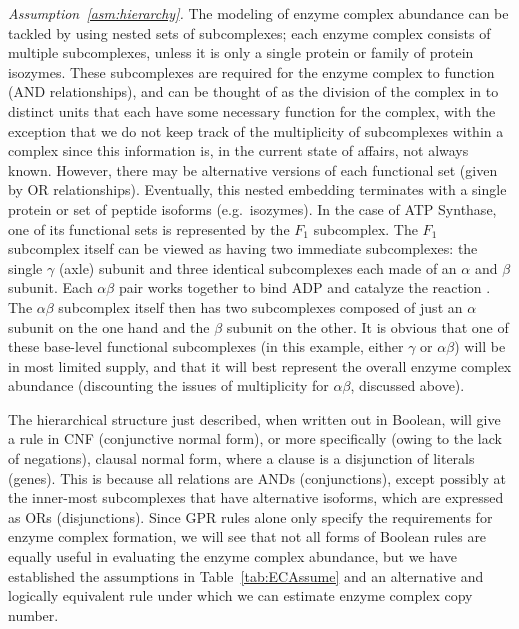 \emph{Assumption~\ref{asm:hierarchy}.}
The modeling of enzyme complex abundance can be tackled by using
nested sets of subcomplexes; each enzyme complex consists of multiple
subcomplexes, unless it is only a single protein or family of protein
isozymes.  These subcomplexes are required for the enzyme complex to
function (AND relationships), and can be thought of as the division of
the complex in to distinct units that each have some necessary
function for the complex, with the exception that we do not keep track
of the multiplicity of subcomplexes within a complex since this
information is, in the current state of affairs, not always known.
However, there may be alternative versions of each functional set
(given by OR relationships). Eventually, this nested embedding
terminates with a single protein or set of peptide isoforms
(e.g.\ isozymes).  In the case of ATP Synthase, one of its functional
sets is represented by the $F_1$ subcomplex. The $F_1$ subcomplex
itself can be viewed as having two immediate subcomplexes: the single
$\gamma$ (axle) subunit and three identical subcomplexes each made of
an $\alpha$ and $\beta$ subunit. Each $\alpha\beta$ pair works
together to bind ADP and catalyze the reaction \citep{Oster2003}. The
$\alpha\beta$ subcomplex itself then has two subcomplexes composed of
just an $\alpha$ subunit on the one hand and the $\beta$ subunit on
the other.  It is obvious that one of these base-level functional
subcomplexes (in this example, either $\gamma$ or $\alpha\beta$) will
be in most limited supply, and that it will best represent the overall
enzyme complex abundance (discounting the issues of multiplicity for
$\alpha\beta$, discussed above).

%
%

The hierarchical structure just described, when written out in
Boolean, will give a rule in CNF (conjunctive normal form), or more
specifically (owing to the lack of negations), clausal normal form,
where a clause is a disjunction of literals (genes). This is because all
relations are ANDs (conjunctions), except possibly at the inner-most
subcomplexes that have alternative isoforms, which are expressed as
ORs (disjunctions). Since GPR rules alone only specify the
requirements for enzyme complex formation, we will see that not all
forms of Boolean rules are equally useful in evaluating the enzyme
complex abundance, but we have established the assumptions in
Table~\ref{tab:ECAssume} and an alternative and logically equivalent rule
\citep{Russell2009} under which we can estimate enzyme complex copy
number.


